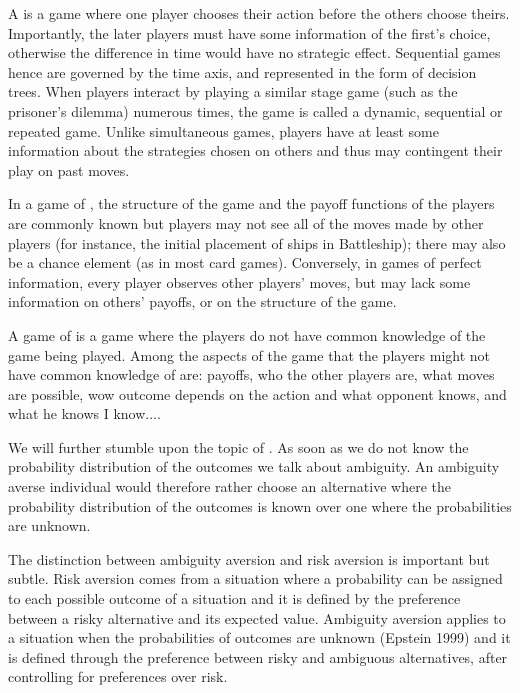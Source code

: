 \begin{definition} 
A  is a game where one player chooses their action before the others choose theirs. Importantly, the later players must have some information of the first's choice, otherwise the difference in time would have no strategic effect. Sequential games hence are governed by the time axis, and represented in the form of decision trees. When players interact by playing a similar stage game (such as the prisoner's dilemma) numerous times, the game is called a dynamic, sequential or repeated game. Unlike simultaneous games, players have at least some information about the strategies chosen on others and thus may contingent their play on past moves.
\end{definition}

\begin{definition}
	In a game of , the structure of the game and the payoff functions of the players are commonly known but players may not see all of the moves made by other players (for instance, the initial placement of ships in Battleship); there may also be a chance element (as in most card games). Conversely, in games of perfect information, every player observes other players' moves, but may lack some information on others' payoffs, or on the structure of the game.
\end{definition}

\begin{definition} 
A game of  is a game where the players do not have common knowledge of the game being played. Among the aspects of the game that the players might not have common knowledge of are: payoffs, who the other players are, what moves are possible, wow outcome depends on the action and  what opponent knows, and what he knows I know....
\end{definition}

We will further stumble upon the topic of . As soon as we do not know the probability distribution of the outcomes we talk about ambiguity. An ambiguity averse individual would therefore  rather choose an alternative where the probability distribution of the outcomes is known over one where the probabilities are unknown.

The distinction between ambiguity aversion and risk aversion is important but subtle. Risk aversion comes from a situation where a probability can be assigned to each possible outcome of a situation and it is defined by the preference between a risky alternative and its expected value. Ambiguity aversion applies to a situation when the probabilities of outcomes are unknown (Epstein 1999) and it is defined through the preference between risky and ambiguous alternatives, after controlling for preferences over risk. \\




\newpage